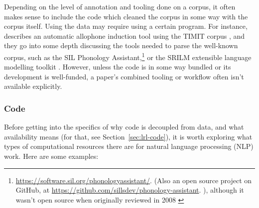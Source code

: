 Depending on the level of annotation and tooling done on a corpus, it often makes sense to include the code which cleaned the corpus in some way with the corpus itself. Using the data may require using a certain program. For instance, \citet{kempton2009finding} describes an automatic allophone induction tool using the TIMIT corpus \citep{garofolo1993darpa}, and they go into some depth discussing the tools needed to parse the well-known corpus, such as the SIL Phonology Assistant,\footnote{\href{https://software.sil.org/phonologyassistant/}{https://software.sil.org/phonologyassistant/}.  (Also an open source project on GitHub, at \href{https://github.com/sillsdev/phonology-assistant}{https://github.com/sillsdev/phonology-assistant}. ), although it wasn't open source when originally reviewed in 2008 \citep{dingemanse2008review}} or the SRILM extensible language modelling toolkit \citep{stolcke2002srilm}. However, unless the code is in some way bundled or its development is well-funded, a paper's combined tooling or workflow often isn't available explicitly.

\subsubsection{Code}

Before getting into the specifics of why code is decoupled from data, and what availability means (for that, see Section~\ref{sec:lrl-code}), it is worth exploring what types of computational resources there are for natural language processing (NLP) work. Here are some examples:


